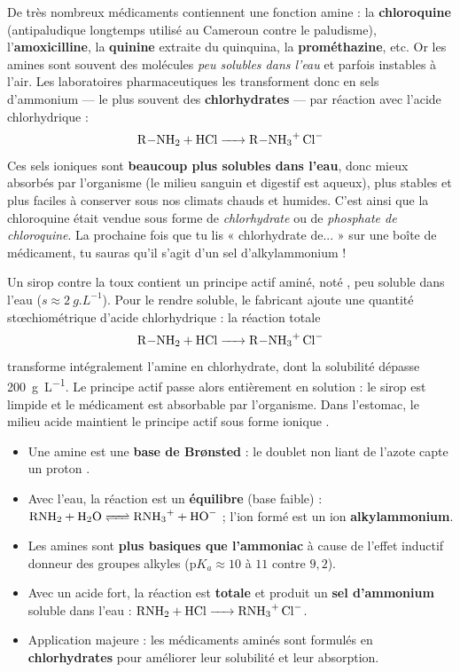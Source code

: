 \documentclass[11pt]{article}
\newcommand{\cle}[1]{{\popxbold\color{popdark}#1}}
\begin{document}
\begin{savaistu}
De très nombreux médicaments contiennent une fonction amine : la \textbf{chloroquine} (antipaludique longtemps utilisé au Cameroun contre le paludisme), l'\textbf{amoxicilline}, la \textbf{quinine} extraite du quinquina, la \textbf{prométhazine}, etc. Or les amines sont souvent des molécules \emph{peu solubles dans l'eau} et parfois instables à l'air. Les laboratoires pharmaceutiques les transforment donc en \cle{sels d'ammonium} — le plus souvent des \textbf{chlorhydrates} — par réaction avec l'acide chlorhydrique :
\[ \ce{R-NH2 + HCl -> R-NH3+ Cl-} \]
Ces sels ioniques sont \textbf{beaucoup plus solubles dans l'eau}, donc mieux absorbés par l'organisme (le milieu sanguin et digestif est aqueux), plus stables et plus faciles à conserver sous nos climats chauds et humides. C'est ainsi que la chloroquine était vendue sous forme de \emph{chlorhydrate} ou de \emph{phosphate de chloroquine}. La prochaine fois que tu lis « chlorhydrate de... » sur une boîte de médicament, tu sauras qu'il s'agit d'un sel d'alkylammonium !
\end{savaistu}

\begin{exemplebox}
Un sirop contre la toux contient un principe actif aminé, noté , peu soluble dans l'eau ($s \approx \SI{2}{g.L^{-1}}$). Pour le rendre soluble, le fabricant ajoute une quantité stœchiométrique d'acide chlorhydrique : la réaction totale
\[ \ce{R-NH2 + HCl -> R-NH3+ Cl-} \]
transforme intégralement l'amine en chlorhydrate, dont la solubilité dépasse \SI{200}{g.L^{-1}}. Le principe actif passe alors entièrement en solution : le sirop est limpide et le médicament est absorbable par l'organisme. Dans l'estomac, le milieu acide maintient le principe actif sous forme ionique .
\end{exemplebox}

\begin{aretenir}
\begin{itemize}
\item Une amine est une \textbf{base de Brønsted} : le doublet non liant de l'azote capte un proton .
\item Avec l'eau, la réaction est un \textbf{équilibre} (base faible) : $\ce{RNH2 + H2O <=> RNH3+ + HO-}$ ; l'ion formé est un ion \textbf{alkylammonium}.
\item Les amines sont \textbf{plus basiques que l'ammoniac} à cause de l'effet inductif donneur des groupes alkyles ($\mathrm{p}K_a \approx 10$ à $11$ contre $9{,}2$).
\item Avec un acide fort, la réaction est \textbf{totale} et produit un \textbf{sel d'ammonium} soluble dans l'eau : $\ce{RNH2 + HCl -> RNH3+ Cl-}$.
\item Application majeure : les médicaments aminés sont formulés en \textbf{chlorhydrates} pour améliorer leur solubilité et leur absorption.
\end{itemize}
\end{aretenir}
\end{document}
